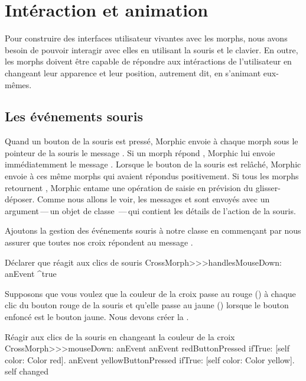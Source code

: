 \documentclass[a4paper,10pt,twoside]{book}
\begin{document}
\section{Intéraction et animation}

Pour construire des interfaces utilisateur vivantes avec les morphs,
nous avons besoin de pouvoir interagir avec elles en utilisant la
souris et le clavier.
En outre, les morphs doivent être capable de répondre aux
intéractions de l'utilisateur en changeant leur apparence et leur
position, autrement dit, en s'animant eux-mêmes.

\subsection{Les événements souris}

Quand un bouton de la souris est pressé, Morphic envoie \`a chaque
morph sous le pointeur de la souris le message
. Si un morph répond , Morphic lui
envoie immédiatemment le message . Lorsque
le bouton de la souris est relâché, Morphic envoie
  \`a ces même morphs qui avaient répondus
positivement. Si tous les morphs retournent , Morphic entame
une opération de
saisie en prévision du glisser-déposer.
Comme nous allons le voir, les messages  et 
sont envoyés avec un argument\,---\,un objet de classe
\,---\,qui contient les détails de l'action de la souris.

Ajoutons la gestion des événements souris \`a notre classe
 en commençant par nous assurer que toutes nos
croix répondent  au message .

\begin{method}{Déclarer que  réagit aux clics de souris}
CrossMorph>>>handlesMouseDown: anEvent
	^true
\end{method}

Supposons que vous voulez que la couleur de la croix passe au rouge
()
\`a chaque clic du bouton rouge de la souris et qu'elle passe au jaune
()
lorsque le bouton enfoncé est le bouton jaune. 
Nous devons créer la .

\begin{method}[mouseDown]{Réagir aux clics de la souris en changeant la couleur de la croix}
CrossMorph>>>mouseDown: anEvent
	anEvent redButtonPressed
		ifTrue: [self color: Color red].
	anEvent yellowButtonPressed
		ifTrue: [self color: Color yellow].
	self changed
\end{method}
\end{document}
